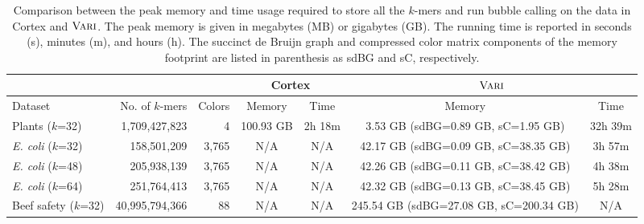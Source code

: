 \begin{table*}%
  \small
  \centering
  \begin{tabular}{| l | r | r | c | c | c |c |}
   	\hline
	\multicolumn{1}{|l}{}
   	& \multicolumn{1}{r}{}	
	& \multicolumn{1}{r}{} 
	& \multicolumn{2}{|c|}{{\sc Cortex}} 
	& \multicolumn{2}{|c|}{$\mbox{\rm {\sc Vari}}$}  \\
	\hline
	 Dataset & No. of $k$-mers & Colors & Memory & Time & Memory & Time \\
	\hline
	Plants	($k$=32)				& 1,709,427,823 	& 4 	& 100.93 GB 	& 2h 18m	& 3.53 GB (sdBG=0.89 GB, sC=1.95 GB) 	& 32h 39m \\
     \emph{E. coli}  ($k$=32)         & 158,501,209       & 3,765 & N/A        & N/A      &  42.17 GB (sdBG=0.09 GB, sC=38.35 GB)     & 3h 57m  \\
     \emph{E. coli}  ($k$=48)         & 205,938,139       & 3,765 & N/A        & N/A      &  42.26 GB (sdBG=0.11 GB, sC=38.42 GB)     & 4h 38m  \\
     \emph{E. coli}  ($k$=64)         & 251,764,413       & 3,765 & N/A        & N/A      &  42.32 GB (sdBG=0.13 GB, sC=38.45 GB)     & 5h 28m  \\
    Beef safety ($k$=32)                            & 40,995,794,366    & 88    & N/A        & N/A   & 245.54 GB (sdBG=27.08 GB, sC=200.34 GB)     & N/A \\
 	\hline
	\end{tabular}
  \caption{Comparison between the peak memory and time usage required to store all the $k$-mers and run bubble calling on the data in {\sc Cortex} and $\mbox{\rm {\sc Vari}}$.
    The peak memory is given in megabytes (MB) or gigabytes (GB). The running time is reported in seconds (s), minutes (m), and hours (h).  The succinct de Bruijn graph and compressed color matrix components of the memory footprint are listed in parenthesis as sdBG and sC, respectively.}
 \label{tbl-cosmo}
\end{table*}


\subsection{}

